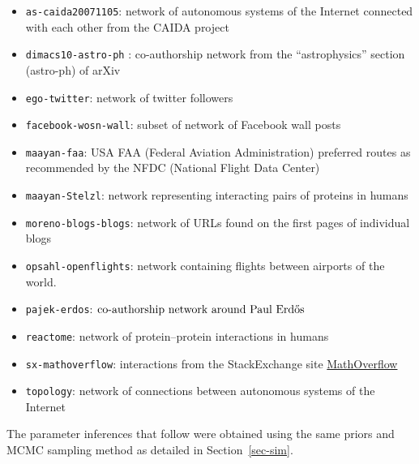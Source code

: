 \documentclass[
  sn-basic,
  10pt,
]{sn-jnl}
\providecommand{\tightlist}{%
  \setlength{\itemsep}{0pt}\setlength{\parskip}{0pt}}
\theoremstyle{plain}
\theoremstyle{plain}
\theoremstyle{remark}
\begin{document}
\begin{itemize}
\tightlist
\item
  \texttt{as-caida20071105}: network of autonomous systems of the
  Internet connected with each other from the CAIDA project
\item
  \texttt{dimacs10-astro-ph} : co-authorship network from the
  ``astrophysics'' section (astro-ph) of arXiv
\item
  \texttt{ego-twitter}: network of twitter followers
\item
  \texttt{facebook-wosn-wall}: subset of network of Facebook wall posts
\item
  \texttt{maayan-faa}: USA FAA (Federal Aviation Administration)
  preferred routes as recommended by the NFDC (National Flight Data
  Center)
\item
  \texttt{maayan-Stelzl}: network representing interacting pairs of
  proteins in humans
\item
  \texttt{moreno-blogs-blogs}: network of URLs found on the first pages
  of individual blogs
\item
  \texttt{opsahl-openflights}: network containing flights between
  airports of the world.
\item
  \texttt{pajek-erdos}:
  \(\text{co-authorship network around Paul Erd\H{o}s}\)
\item
  \texttt{reactome}: network of protein--protein interactions in humans
\item
  \texttt{sx-mathoverflow}: interactions from the StackExchange site
  \href{https://mathoverflow.net/}{MathOverflow}
\item
  \texttt{topology}: network of connections between autonomous systems
  of the Internet
\end{itemize}

The parameter inferences that follow were obtained using the same priors
and MCMC sampling method as detailed in Section~\ref{sec-sim}.
\end{document}
